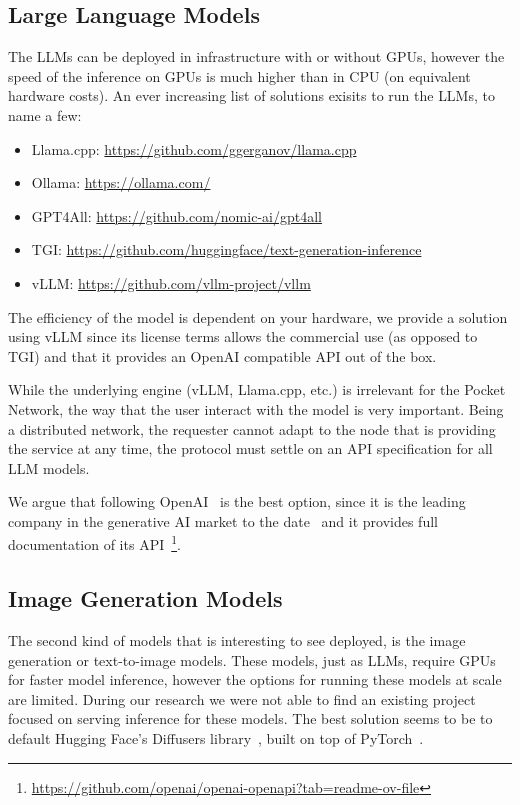\subsection{Large Language Models}
The \glspl{LLM} can be deployed in infrastructure with or without \glspl{GPU}, however the speed of the inference on \glspl{GPU} is much higher than in CPU (on equivalent hardware costs). An ever increasing list of solutions exisits to run the \glspl{LLM}, to name a few:
\begin{itemize}
    \item Llama.cpp: \url{https://github.com/ggerganov/llama.cpp}
    \item Ollama: \url{https://ollama.com/}
    \item GPT4All: \url{https://github.com/nomic-ai/gpt4all}
    \item TGI: \url{https://github.com/huggingface/text-generation-inference}
    \item vLLM: \url{https://github.com/vllm-project/vllm}
\end{itemize}
The efficiency of the model is dependent on your hardware, we provide a solution using vLLM since its license terms allows the commercial use (as opposed to TGI) and that it provides an OpenAI compatible API out of the box.

While the underlying engine (vLLM, Llama.cpp, etc.) is irrelevant for the Pocket Network, the way that the user interact with the model is very important. Being a distributed network, the requester cannot adapt to the node that is providing the service at any time, the protocol must settle on an API specification for all \gls{LLM} models. 

We argue that following OpenAI~\cite{openAI_API} is the best option, since it is the leading company in the generative \gls{AI} market to the date~\cite{generative_ai_market} and it provides full documentation of its API~\footnote{\url{https://github.com/openai/openai-openapi?tab=readme-ov-file}}.
 
\subsection{Image Generation Models}
The second kind of models that is interesting to see deployed, is the image generation or text-to-image models. These models, just as \glspl{LLM}, require \glspl{GPU} for faster model inference, however the options for running these models at scale are limited. 
During our research we were not able to find an existing project focused on serving inference for these models. The best solution seems to be to default Hugging Face's Diffusers library~\cite{hf_diffusers}, built on top of PyTorch~\cite{paszke2017automatic}. 

